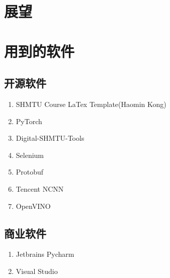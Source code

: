 \section{展望}

\section{用到的软件}

\subsection{开源软件}

\begin{enumerate}
	\item SHMTU Course LaTex Template(Haomin Kong)\cite{shmtu_course_latex_template}
	\item PyTorch\cite{pytorch}
	\item Digital-SHMTU-Tools\cite{digit_shmtu}
	\item Selenium
	\item Protobuf
	\item Tencent NCNN
	\item OpenVINO
\end{enumerate}

\subsection{商业软件}

\begin{enumerate}
	\item Jetbrains Pycharm
	\item Visual Studio
\end{enumerate}
